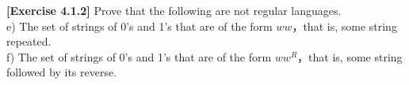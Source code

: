 \textbf{[Exercise 4.1.2]} Prove that the following are not regular languages.\\
e) The set of strings of 0's and 1's that are of the form $ww$，that     
is, some string repeated.\\
f) The set of strings of 0's and 1's that are of the form $ww^R$，that     
is, some string followed by its reverse.